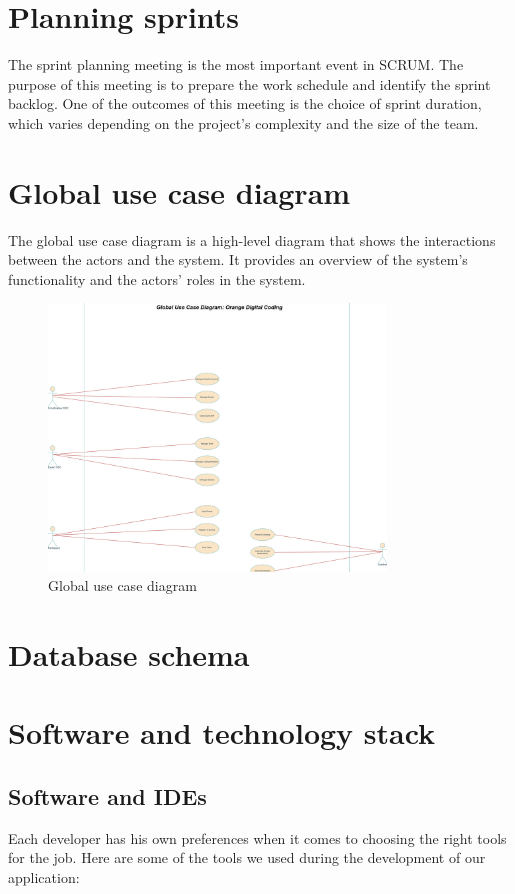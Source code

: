 \section{Planning sprints}
The sprint planning meeting is the most important event in SCRUM. The purpose
of this meeting is to prepare the work schedule and identify the sprint
backlog. One of the outcomes of this meeting is the choice of sprint duration,
which varies depending on the project's complexity and the size of the team.

\section{Global use case diagram}
The global use case diagram is a high-level diagram that shows the interactions
between the actors and the system. It provides an overview of the system's
functionality and the actors' roles in the system.
\begin{figure}[h!]
      \centering
      \includegraphics[width=0.8\textwidth]{../images/useCaseGlobal.png}
      \caption{Global use case diagram}
      \label{fig:use_case_diagram}
\end{figure}

\section{Database schema}

\section{Software and technology stack}

\subsection{Software and IDEs}
Each developer has his own preferences when it comes to choosing the right
tools for the job. Here are some of the tools we used during the development of
our application:

